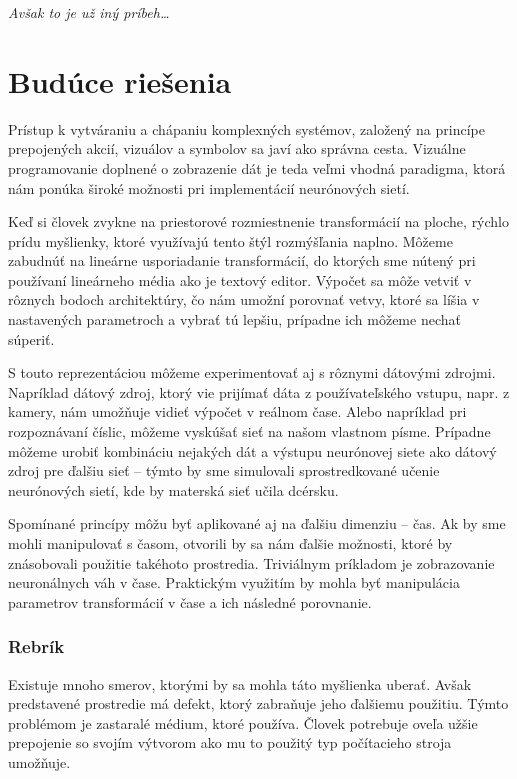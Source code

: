 \bigskip

\emph{Avšak to je už iný príbeh\dots}

\section{Budúce riešenia}

Prístup k vytváraniu a chápaniu komplexných systémov, založený na princípe prepojených akcií, vizuálov a symbolov sa javí ako správna cesta. Vizuálne programovanie doplnené o zobrazenie dát je teda veľmi vhodná paradigma, ktorá nám ponúka široké možnosti pri implementácií neurónových sietí.

Keď si človek zvykne na priestorové rozmiestnenie transformácií na ploche, rýchlo prídu myšlienky, ktoré využívajú tento štýl rozmýšľania naplno. Môžeme zabudnúť na lineárne usporiadanie transformácií, do ktorých sme nútený pri používaní lineárneho média ako je textový editor. Výpočet sa môže vetviť v rôznych bodoch architektúry, čo nám umožní porovnať vetvy, ktoré sa líšia v nastavených parametroch a vybrať tú lepšiu, prípadne ich môžeme nechať súperiť.

S touto reprezentáciou môžeme experimentovať aj s rôznymi dátovými zdrojmi. Napríklad dátový zdroj, ktorý vie prijímať dáta z používateľského vstupu, napr. z kamery, nám umožňuje vidieť výpočet v reálnom čase. Alebo napríklad pri rozpoznávaní číslic, môžeme vyskúšať sieť na našom vlastnom písme. Prípadne môžeme urobiť kombináciu nejakých dát a výstupu neurónovej siete ako dátový zdroj pre ďalšiu sieť -- týmto by sme simulovali sprostredkované učenie neurónových sietí, kde by materská sieť učila dcérsku.

Spomínané princípy môžu byť aplikované aj na ďalšiu dimenziu -- čas. Ak by sme mohli manipulovať s časom, otvorili by sa nám ďalšie možnosti, ktoré by znásobovali použitie takéhoto prostredia. Triviálnym príkladom je zobrazovanie neuronálnych váh v čase. Praktickým využitím by mohla byť manipulácia parametrov transformácií v čase a ich následné porovnanie.

\subsubsection{Rebrík}

Existuje mnoho smerov, ktorými by sa mohla táto myšlienka uberať. Avšak predstavené prostredie má defekt, ktorý zabraňuje jeho ďalšiemu použitiu. Týmto problémom je zastaralé médium, ktoré používa. Človek potrebuje oveľa užšie prepojenie so svojím výtvorom ako mu to použitý typ počítacieho stroja umožňuje.

